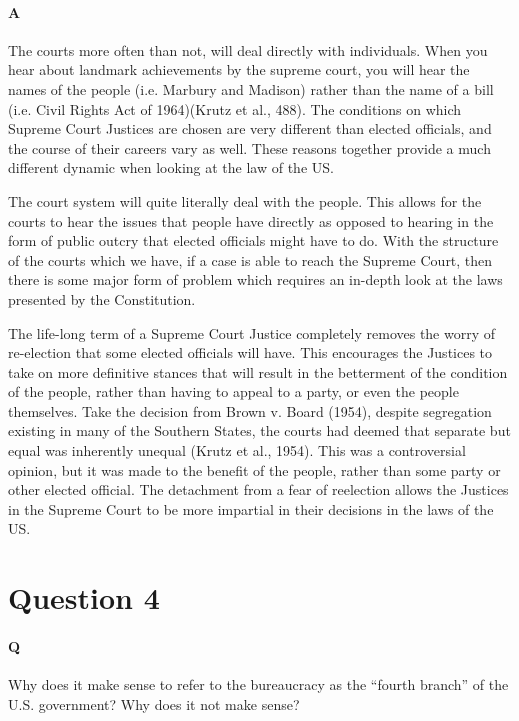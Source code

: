 \documentclass[12pt]{article}
\begin{document}
\paragraph{A}
The courts more often than not, will deal directly with
individuals. When you hear about landmark achievements by the supreme
court, you will hear the names of the people (i.e. Marbury and
Madison) rather than the name of a bill (i.e. Civil Rights Act of
1964)(Krutz et al., 488). The conditions on which Supreme Court
Justices are chosen are very different than elected officials, and the
course of their careers vary as well. These reasons together provide a
much different dynamic when looking at the law of the US.
\par
The court system will quite literally deal with the people. This
allows for the courts to hear the issues that people have directly as
opposed to hearing in the form of public outcry that elected officials
might have to do. With the structure of the courts which we have, if a
case is able to reach the Supreme Court, then there is some major form
of problem which requires an in-depth look at the laws presented by
the Constitution.
\par
The life-long term of a Supreme Court Justice completely removes the
worry of re-election that some elected officials will have. This
encourages the Justices to take on more definitive stances that will
result in the betterment of the condition of the people, rather than
having to appeal to a party, or even the people themselves. Take the
decision from Brown v. Board (1954), despite segregation existing in
many of the Southern States, the courts had deemed that separate but
equal was inherently unequal (Krutz et al., 1954). This was a
controversial opinion, but it was made to the benefit of the people,
rather than some party or other elected official. The detachment from
a fear of reelection allows the Justices in the Supreme Court to be
more impartial in their decisions in the laws of the US.
\section*{Question 4}
\paragraph{Q}
Why does it make sense to refer to the bureaucracy as the “fourth branch” of the
U.S. government? Why does it not make sense?
\end{document}

